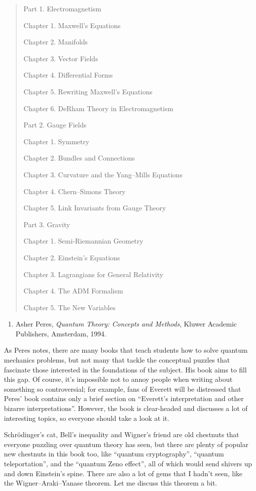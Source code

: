 \documentclass{article}
\def\tightlist{}
\begin{document}
\begin{quote}
{\rm
Part 1. Electromagnetism

Chapter 1. Maxwell's Equations

Chapter 2. Manifolds

Chapter 3. Vector Fields

Chapter 4. Differential Forms

Chapter 5. Rewriting Maxwell's Equations

Chapter 6. DeRham Theory in Electromagnetism

Part 2. Gauge Fields

Chapter 1. Symmetry

Chapter 2. Bundles and Connections

Chapter 3. Curvature and the Yang--Mills Equations

Chapter 4. Chern--Simons Theory

Chapter 5. Link Invariants from Gauge Theory

Part 3. Gravity

Chapter 1. Semi-Riemannian Geometry

Chapter 2. Einstein's Equations

Chapter 3. Lagrangians for General Relativity

Chapter 4. The ADM Formalism

Chapter 5. The New Variables
}
\end{quote}

\begin{enumerate}
\def\labelenumi{\arabic{enumi})}
\setcounter{enumi}{1}
\tightlist
\item
  Asher Peres, \emph{Quantum Theory: Concepts and Methods}, Kluwer
  Academic Publishers, Amsterdam, 1994.
\end{enumerate}
\noindent
As Peres notes, there are many books that teach students how to solve
quantum mechanics problems, but not many that tackle the conceptual
puzzles that fascinate those interested in the foundations of the
subject. His book aims to fill this gap. Of course, it's impossible not
to annoy people when writing about something so controversial; for
example, fans of Everett will be distressed that Peres' book contains
only a brief section on ``Everett's interpretation and other bizarre
interpretations''. However, the book is clear-headed and discusses a lot
of interesting topics, so everyone should take a look at it.

Schr\"odinger's cat, Bell's inequality and Wigner's friend are old
chestnuts that everyone puzzling over quantum theory has seen, but there
are plenty of popular new chestnuts in this book too, like ``quantum
cryptography'', ``quantum teleportation'', and the ``quantum Zeno
effect'', all of which would send shivers up and down Einstein's spine.
There are also a lot of gems that I hadn't seen, like the
Wigner--Araki--Yanase theorem. Let me discuss this theorem a bit.
\end{document}
